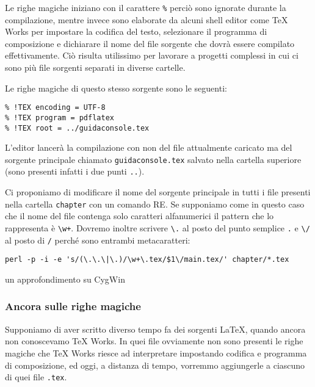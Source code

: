 Le righe magiche iniziano con il carattere \texttt{\%} perciò sono ignorate
durante la compilazione, mentre invece sono elaborate da alcuni shell editor
come TeX Works per impostare la codifica del testo, selezionare il programma di
composizione e dichiarare il nome del file sorgente che dovrà essere compilato
effettivamente. Ciò risulta utilissimo per lavorare a progetti complessi in cui
ci sono più file sorgenti separati in diverse cartelle.

Le righe magiche di questo stesso sorgente sono le seguenti:
\begin{verbatim}
% !TEX encoding = UTF-8
% !TEX program = pdflatex
% !TEX root = ../guidaconsole.tex
\end{verbatim}
L'editor lancerà la compilazione con  non del file attualmente
caricato ma del sorgente principale chiamato \texttt{guidaconsole.tex} salvato
nella cartella superiore (sono presenti infatti i due punti \texttt{..}).

Ci proponiamo di modificare il nome del sorgente principale in tutti i file
presenti nella cartella \texttt{chapter} con un comando RE. Se supponiamo come
in questo caso che il nome del file contenga solo caratteri alfanumerici il
pattern che lo rappresenta è \texttt{\textbackslash w+}. Dovremo inoltre
scrivere \texttt{\textbackslash .} al posto del punto semplice \texttt{.} e
\texttt{\textbackslash /} al posto di \texttt{/} perché sono entrambi
metacaratteri:
\begin{Verbatim}[fontsize=\small]
perl -p -i -e 's/(\.\.\|\.)/\w+\.tex/$1\/main.tex/' chapter/*.tex
\end{Verbatim}

un approfondimento su CygWin
\subsubsection{Ancora sulle righe magiche}
\label{sssec:addheader}

Supponiamo di aver scritto diverso tempo fa dei sorgenti \LaTeX, quando ancora
non conoscevamo TeX Works. In quei file ovviamente non sono
presenti le righe magiche che TeX Works riesce ad
interpretare impostando codifica e programma di composizione, ed oggi, a
distanza di tempo, vorremmo aggiungerle a ciascuno di quei file \texttt{.tex}.

